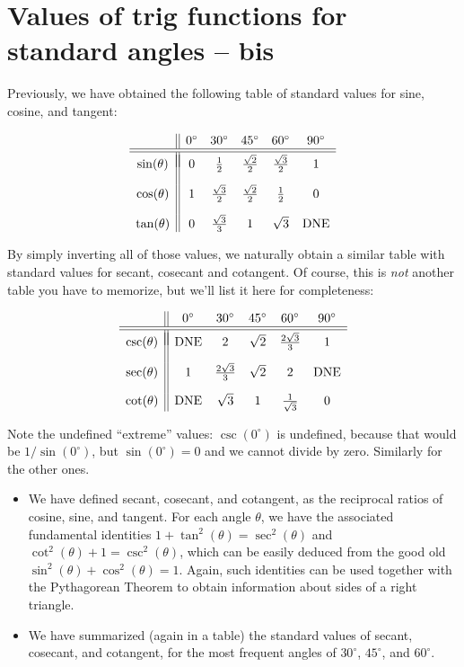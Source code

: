 \documentclass{ximera}
\begin{document}
\section{Values of trig functions for standard angles -- bis}

Previously, we have obtained the following table of standard values for sine, cosine, and tangent:

$$
\begin{array}{c||ccccc}
 & 0^\circ & 30^\circ & 45^\circ & 60^\circ & 90^\circ \\
\hline\hline \\[-1em]  
\sin(\theta) & 0 & \frac{1}{2} & \frac{\sqrt{2}}{2} & \frac{\sqrt{3}}{2} & 1 \\[1em]
 \cos(\theta) & 1 & \frac{\sqrt{3}}{2} & \frac{\sqrt{2}}{2} & \frac{1}{2} & 0 \\[1em]
\tan(\theta)& 0 & \frac{\sqrt{3}}{3} & 1 & \sqrt{3} & {\rm DNE}
\end{array}
$$

By simply inverting all of those values, we naturally obtain a similar table with standard values for secant, cosecant and cotangent. Of course, this is \emph{not} another table you have to memorize, but we'll list it here for completeness:

$$
\begin{array}{c||ccccc}
 & 0^\circ & 30^\circ & 45^\circ & 60^\circ & 90^\circ \\
\hline\hline \\[-1em]  
\csc(\theta) & {\rm DNE} & 2 & \sqrt{2} & \frac{2\sqrt{3}}{3} & 1 \\[1em]
 \sec(\theta) & 1 & \frac{2\sqrt{3}}{3} & \sqrt{2} & 2 & {\rm DNE} \\[1em]
\cot(\theta)& {\rm DNE} & \sqrt{3} & 1 & \frac{1}{\sqrt{3}} & 0
\end{array}
$$

Note the undefined ``extreme'' values: $\csc(0^\circ)$ is undefined, because that would be $1/\sin(0^\circ)$, but $\sin(0^\circ) = 0$ and we cannot divide by zero. Similarly for the other ones.


\begin{summary}\begin{itemize}
\item We have defined secant, cosecant, and cotangent, as the reciprocal ratios of cosine, sine, and tangent. For each angle $\theta$, we have the associated fundamental identities $1+\tan^2(\theta)=\sec^2(\theta)$ and $\cot^2(\theta) + 1 = \csc^2(\theta)$, which can be easily deduced from the good old $\sin^2(\theta)+\cos^2(\theta)=1$. Again, such identities can be used together with the Pythagorean Theorem to obtain information about sides of a right triangle.
\item We have summarized (again in a table) the standard values of secant, cosecant, and cotangent, for the most frequent angles of $30^\circ$, $45^\circ$, and $60^\circ$.
\end{itemize}\end{summary}
\end{document}
